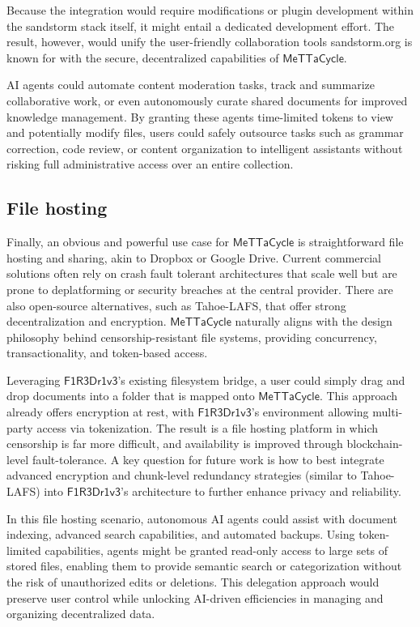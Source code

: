 \documentclass{article}
\newcommand{\MC}{\mathsf{MeTTaCycle}}
\newcommand{\FD}{\mathsf{F1R3Dr1v3}}
\begin{document}
Because the integration would require modifications or plugin
development within the sandstorm stack itself, it might entail a
dedicated development effort. The result, however, would unify the
user-friendly collaboration tools sandstorm.org is known for with the
secure, decentralized capabilities of $\MC$.

AI agents could automate content moderation tasks, track and summarize
collaborative work, or even autonomously curate shared documents for
improved knowledge management. By granting these agents time-limited
tokens to view and potentially modify files, users could safely
outsource tasks such as grammar correction, code review, or content
organization to intelligent assistants without risking full
administrative access over an entire collection.

\subsection{File hosting}

Finally, an obvious and powerful use case for $\MC$ is straightforward
file hosting and sharing, akin to Dropbox or Google Drive. Current
commercial solutions often rely on crash fault tolerant architectures
that scale well but are prone to deplatforming or security breaches at
the central provider. There are also open-source alternatives, such as
Tahoe-LAFS, that offer strong decentralization and encryption. $\MC$
naturally aligns with the design philosophy behind
censorship-resistant file systems, providing concurrency,
transactionality, and token-based access.

Leveraging $\FD$'s existing filesystem bridge, a user could simply
drag and drop documents into a folder that is mapped onto $\MC$. This
approach already offers encryption at rest, with $\FD$'s environment
allowing multi-party access via tokenization. The result is a file
hosting platform in which censorship is far more difficult, and
availability is improved through blockchain-level fault-tolerance. A
key question for future work is how to best integrate advanced
encryption and chunk-level redundancy strategies (similar to
Tahoe-LAFS) into $\FD$'s architecture to further enhance privacy and
reliability.

In this file hosting scenario, autonomous AI agents could assist with
document indexing, advanced search capabilities, and automated
backups. Using token-limited capabilities, agents might be granted
read-only access to large sets of stored files, enabling them to
provide semantic search or categorization without the risk of
unauthorized edits or deletions. This delegation approach would
preserve user control while unlocking AI-driven efficiencies in
managing and organizing decentralized data.
\end{document}
